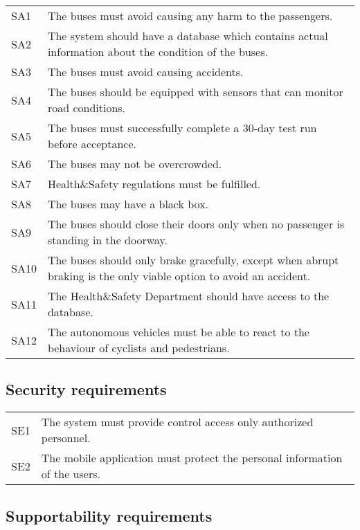 \documentclass[a4paper]{article}
\begin{document}
\begin{tabular}{l l}
        SA1 & The buses must avoid causing any harm to the passengers. \\
        SA2 & The system should have a database which contains actual information about the condition of the buses. \\
        SA3 & The buses must avoid causing accidents. \\
        SA4 & The buses should be equipped with sensors that can monitor road conditions. \\
        SA5 & The buses must successfully complete a 30-day test run before acceptance. \\
        SA6 & The buses may not be overcrowded. \\
        SA7 & Health\&Safety regulations must be fulfilled. \\
        SA8 & The buses may have a black box. \\
        SA9 & The buses should close their doors only when no passenger is standing in the doorway. \\
        SA10 & The buses should only brake gracefully, except when abrupt braking is the only viable option to avoid an accident. \\
        SA11 & The Health\&Safety Department should have access to the database. \\
        SA12 & The autonomous vehicles must be able to react to the behaviour of cyclists and pedestrians. \\
\end{tabular}




\subsection{Security requirements}

\begin{tabular}{l l}
        SE1 & The system must provide control access only authorized personnel. \\
        SE2 & The mobile application must protect the personal information of the users. \\
\end{tabular}




\subsection{Supportability requirements}
\end{document}
